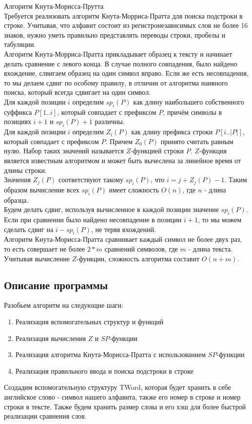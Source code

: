 \documentclass[12pt]{article}
\begin{document}
	Алгоритм Кнута-Морисса-Прутта 
	\\Требуется реализовать алгоритм Кнута-Морриса-Пратта для поиска 
	подстроки в строке. Учитывая, что алфавит состоит из регистронезависимых слов не более
	16 знаков, нужно уметь правильно представлять переводы строки, пробелы и табуляции.
	\\ Алгоритм Кнута-Морриса-Пратта прикладывает образец к тексту и начинает делать сравнение
	с левого конца. В случае полного совпадения, было найдено вхождение, слвигаем образец на один символ вправо. Если же есть
	несовпадения, то мы делаем сдвиг по особому правилу, в отличии от алгоритма наивного поиска, который всегда сдвигает на 
	один символ.
	\\Для каждой позиции $i$ определим $sp_i(P)$ как длину наибольшего собственного суффикса $P[1..i]$, который совпадает с префиксом
	$P$, причём символы в позициях $i+1$ и $sp_i(P) + 1$ различны.
	\\ Для каждой позиции $i$ определим $Z_i(P)$ как длину префикса строки $P[i..|P|]$, который совпадает с префиксом $P$. Причем $Z_0(P)$ принято считать равным нулю.
	Набор таких значений называется $Z$-функцией строки $P$. $Z$-функция является известным алгоритмом и может быть вычеслена за линейное время от длины строки.
	\\ Значения $Z_j(P)$ соответствуют такому $sp_i(P)$, что $i = j + Z_j(P) - 1$. Таким образом вычисление всех $sp_i(P)$ имеет сложность $O(n)$, где $n$ - длина образца.
	\\ Будем делать сдвиг, используя вычисленное в каждой позиции значение $sp_i(P)$. Если при сравнении было найдено несовпадение в позиции $i + 1$, то мы можем сделать сдвиг на $i - sp_i(P)$, не теряя вхождений.
	\\ Алгоритм Кнута-Морисса-Пратта сравнивает каждый символ не более двух раз, то есть совершает не более $2*m$ сравнений символов, где $m$ - длина текста. Учитывая вычисление $Z$-функции, сложность алгоритма составит $O(n + m)$.
	
	\subsection*{Описание программы}
	
	Разобьем алгоритм на следующие шаги:
	\begin{enumerate}
		\item Реализация вспомогательных структур и функций
		\item Реализация вычисления $Z$ и $SP$-функции
		\item Реализация алгоритма Кнута-Морисса-Пратта с использованием $SP$-функции
		\item Реализация правильного ввода и поиска подстроки в строке
	\end{enumerate}
	Создадим вспомогательную структуру TWord, которая будет хранить в себе английское слово - символ нашего алфавита, также его номер в строке и номер строки в тексте. Также будем хранить размер слова и его хэш для более быстрой реализации сравнения слов.
	
\end{document}
